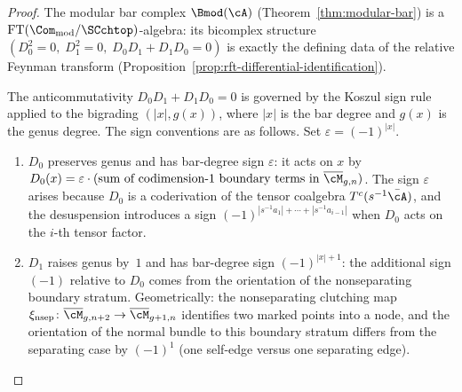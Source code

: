 \begin{proof}
The modular bar complex $\Bmod(\cA)$
(Theorem~\ref{thm:modular-bar}) is a
$\mathrm{FT}(\Com_{\mathrm{mod}} / \SCchtop)$-algebra:
its bicomplex structure $(D_0^2 = 0,\; D_1^2 = 0,\;
D_0 D_1 + D_1 D_0 = 0)$ is exactly the defining data of the
relative Feynman transform
(Proposition~\ref{prop:rft-differential-identification}).

\begin{remark}
\label{rem:bicomplex-signs}
The anticommutativity $D_0 D_1 + D_1 D_0 = 0$ is governed by the
Koszul sign rule applied to the bigrading $(|x|, g(x))$, where
$|x|$ is the bar degree and $g(x)$ is the genus degree. The sign
conventions are as follows. Set $\varepsilon = (-1)^{|x|}$.
\begin{enumerate}[label=\textup{(\roman*)}]
\item $D_0$ preserves genus and has bar-degree sign
 $\varepsilon$: it acts on $x$ by $D_0(x) = \varepsilon \cdot
 (\text{sum of codimension-1 boundary terms in } \Mbar_{g,n})$.
 The sign $\varepsilon$ arises because $D_0$ is a coderivation
 of the tensor coalgebra $T^c(s^{-1}\bar\cA)$, and the
 desuspension introduces a sign $(-1)^{|s^{-1}a_1| + \cdots +
 |s^{-1}a_{i-1}|}$ when $D_0$ acts on the $i$-th tensor factor.

\item $D_1$ raises genus by~$1$ and has bar-degree sign
 $(-1)^{|x|+1}$: the additional sign $(-1)$ relative to $D_0$
 comes from the orientation of the nonseparating boundary stratum.
 Geometrically: the nonseparating clutching map
 $\xi_{\mathrm{nsep}}\colon \Mbar_{g,n+2} \to
 \Mbar_{g+1,n}$ identifies two marked points into a node, and
 the orientation of the normal bundle to this boundary stratum
 differs from the separating case by $(-1)^1$
 (one self-edge versus one separating edge).


\end{enumerate}
\end{remark}
\end{proof}
